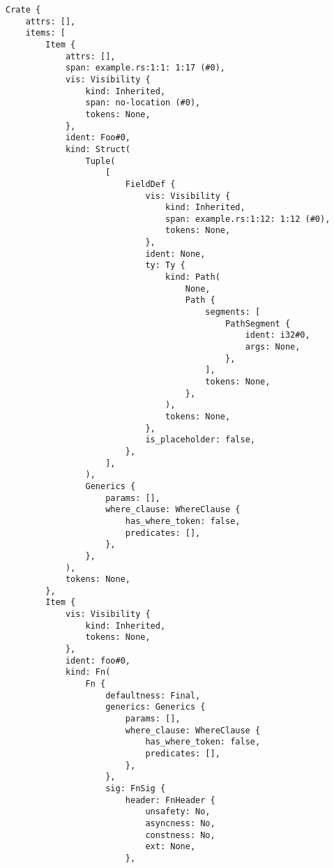 \begin{verbatim}
Crate {
    attrs: [],
    items: [
        Item {
            attrs: [],
            span: example.rs:1:1: 1:17 (#0),
            vis: Visibility {
                kind: Inherited,
                span: no-location (#0),
                tokens: None,
            },
            ident: Foo#0,
            kind: Struct(
                Tuple(
                    [
                        FieldDef {
                            vis: Visibility {
                                kind: Inherited,
                                span: example.rs:1:12: 1:12 (#0),
                                tokens: None,
                            },
                            ident: None,
                            ty: Ty {
                                kind: Path(
                                    None,
                                    Path {
                                        segments: [
                                            PathSegment {
                                                ident: i32#0,
                                                args: None,
                                            },
                                        ],
                                        tokens: None,
                                    },
                                ),
                                tokens: None,
                            },
                            is_placeholder: false,
                        },
                    ],
                ),
                Generics {
                    params: [],
                    where_clause: WhereClause {
                        has_where_token: false,
                        predicates: [],
                    },
                },
            ),
            tokens: None,
        },
        Item {
            vis: Visibility {
                kind: Inherited,
                tokens: None,
            },
            ident: foo#0,
            kind: Fn(
                Fn {
                    defaultness: Final,
                    generics: Generics {
                        params: [],
                        where_clause: WhereClause {
                            has_where_token: false,
                            predicates: [],
                        },
                    },
                    sig: FnSig {
                        header: FnHeader {
                            unsafety: No,
                            asyncness: No,
                            constness: No,
                            ext: None,
                        },

\end{verbatim}
